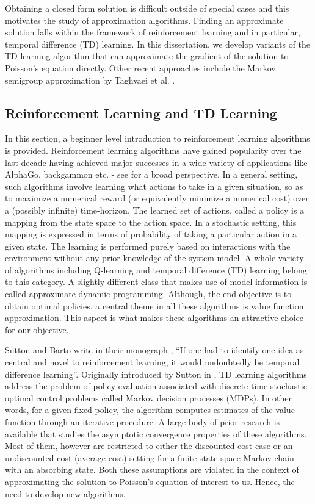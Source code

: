 Obtaining a closed form solution is difficult outside of special cases and this motivates the study of approximation algorithms. Finding an approximate solution falls within the framework of reinforcement learning and in particular, temporal difference (TD) learning. In this dissertation, we develop variants of the TD learning algorithm that can approximate the gradient of the solution to Poisson's equation directly. Other recent approaches include the Markov semigroup approximation by Taghvaei et al. \cite{tagmeh16a}.


\subsection{Reinforcement Learning and TD Learning}
\label{s:rl_td}
In this section, a beginner level introduction to reinforcement learning algorithms is provided. Reinforcement learning algorithms have gained popularity over the last decade having achieved major successes in a wide variety of applications like AlphaGo, backgammon etc. - see \cite{mnih2015} for a broad perspective. In a general setting, such algorithms involve learning what actions to take in a given situation, so as to maximize a numerical reward (or equivalently minimize a numerical cost) over a (possibly infinite) time-horizon. The learned set of actions, called a policy is a mapping from the state space to the action space. In a stochastic setting, this mapping is expressed in terms of probability of taking a particular action in a given state. The learning is performed purely based on interactions with the environment without any prior knowledge of the system model. A whole variety of algorithms including Q-learning \cite{watday92a} and temporal difference (TD) learning \cite{sut88} belong to this category. A slightly different class that makes use of model information is called approximate dynamic programming. Although, the end objective is to obtain optimal policies, a central theme in all these algorithms is value function approximation. This aspect is what makes these algorithms an attractive choice for our objective. 

Sutton and Barto write in their monograph \cite{sutbar98}, ``If one had to identify one idea as central and novel to reinforcement learning, it would undoubtedly be temporal difference learning''. Originally introduced by Sutton in \cite{sut88}, TD learning algorithms address the problem of policy evaluation associated with discrete-time stochastic optimal control problems called Markov decision processes (MDPs). In other words, for a given fixed policy, the algorithm computes estimates of the value function through an iterative procedure. A large body of prior research is available that studies the asymptotic convergence properties of these algorithms. Most of them, however are restricted to either the discounted-cost case or an undiscounted-cost (average-cost) setting for a finite state space Markov chain with an absorbing state. Both these assumptions are violated in the context of approximating the solution to Poisson's equation of interest to us. Hence, the need to develop new algorithms. 

